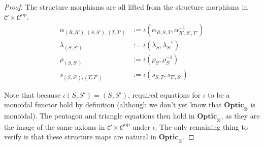 \documentclass[11pt,a4paper]{article}
\theoremstyle{plain}
\theoremstyle{definition}
\newcommand{\C}{\mathscr{C}}
\newcommand{\Optic}{\mathbf{Optic}}
\newcommand{\op}{\mathrm{op}}
\newcommand{\todo}[1]{\textcolor{red}{\small #1}}
\begin{document}
\begin{proof}

  The structure morphisms are all lifted from the structure morphisms in $\C \times \C^\op$:
  \begin{align*}
    \alpha_{(R, R'), (S, S'), (T, T')} &:= \iota(\alpha_{R,S,T}, \alpha_{R',S',T'}^{-1}) \\
    \lambda_{(S, S')} &:= \iota(\lambda_{S}, \lambda_{S'}^{-1}) \\
    \rho_{(S, S')} &:= \iota(\rho_{S}, \rho_{S'}^{-1}) \\
    s_{(S, S'), (T, T')} &:= \iota(s_{S, T}, s_{T', S'})
  \end{align*}

  Note that because $\iota(S, S') = (S, S')$, required equations for $\iota$ to be a monoidal functor hold by definition (although we don't yet know that $\Optic_\otimes$ is monoidal). The pentagon and triangle equations then hold in $\Optic_\otimes$, as they are the image of the same axioms in $\C \times \C^\op$ under $\iota$. The only remaining thing to verify is that these structure maps are natural in $\Optic_\otimes$.


\end{proof}
\end{document}

